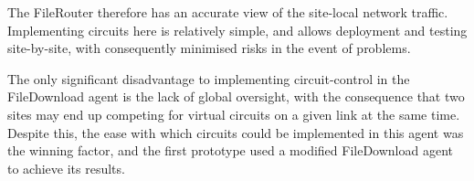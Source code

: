 The FileRouter therefore has an accurate view of the site-local network traffic. Implementing circuits here is relatively simple, and allows deployment and testing site-by-site, with consequently minimised risks in the event of problems.

The only significant disadvantage to implementing circuit-control in the FileDownload agent is the lack of global oversight, with the consequence that two sites may end up competing for virtual circuits on a given link at the same time. Despite this, the ease with which circuits could be implemented in this agent was the winning factor, and the first prototype used a modified FileDownload agent to achieve its results.